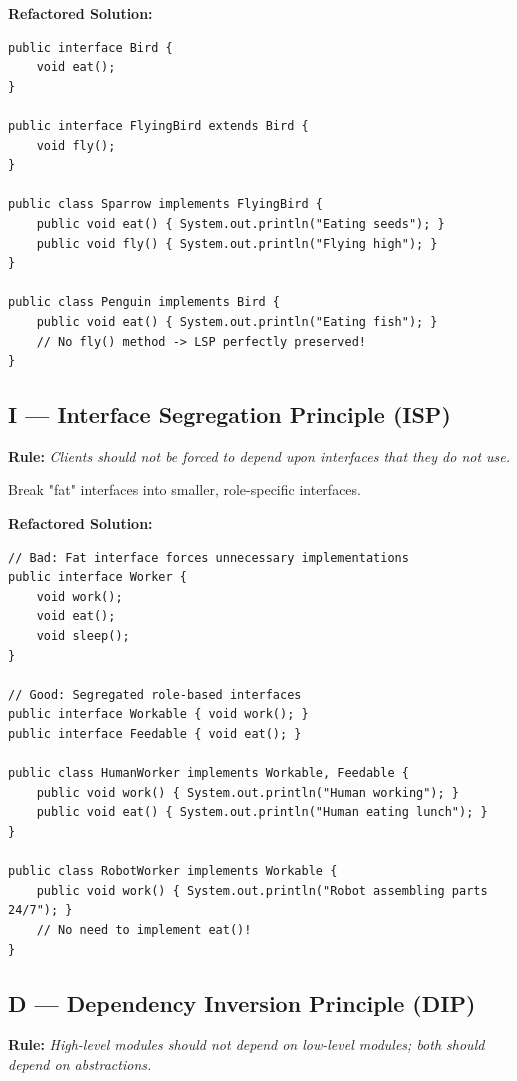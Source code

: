 \documentclass[10pt,journal,compsoc,onecolumn]{IEEEtran}
\begin{document}
\textbf{Refactored Solution:}
\begin{verbatim}
public interface Bird {
    void eat();
}

public interface FlyingBird extends Bird {
    void fly();
}

public class Sparrow implements FlyingBird {
    public void eat() { System.out.println("Eating seeds"); }
    public void fly() { System.out.println("Flying high"); }
}

public class Penguin implements Bird {
    public void eat() { System.out.println("Eating fish"); }
    // No fly() method -> LSP perfectly preserved!
}
\end{verbatim}

\subsection{I --- Interface Segregation Principle (ISP)}
\textbf{Rule:} \emph{Clients should not be forced to depend upon interfaces that they do not use.}

Break "fat" interfaces into smaller, role-specific interfaces.

\textbf{Refactored Solution:}
\begin{verbatim}
// Bad: Fat interface forces unnecessary implementations
public interface Worker {
    void work();
    void eat();
    void sleep();
}

// Good: Segregated role-based interfaces
public interface Workable { void work(); }
public interface Feedable { void eat(); }

public class HumanWorker implements Workable, Feedable {
    public void work() { System.out.println("Human working"); }
    public void eat() { System.out.println("Human eating lunch"); }
}

public class RobotWorker implements Workable {
    public void work() { System.out.println("Robot assembling parts 24/7"); }
    // No need to implement eat()!
}
\end{verbatim}

\subsection{D --- Dependency Inversion Principle (DIP)}
\textbf{Rule:} \emph{High-level modules should not depend on low-level modules; both should depend on abstractions.}
\end{document}
